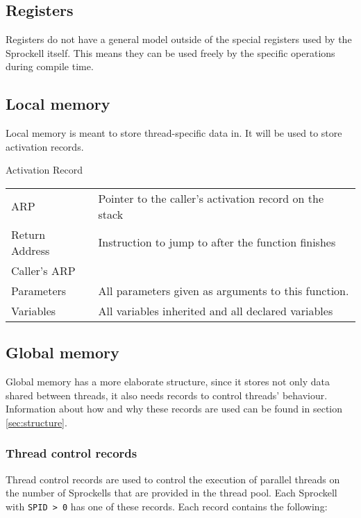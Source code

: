 \documentclass[10pt,a4paper]{report}
\begin{document}
\subsection{Registers}
Registers do not have a general model outside of the special registers used by the Sprockell itself. This means they can be used freely by the specific operations during compile time.

\subsection{Local memory}
Local memory is meant to store thread-specific data in. It will be used to store activation records. 

\label{fig:actrecord}
Activation Record
 
\begin{tabular}{| l | l |}
\hline
	ARP
		& Pointer to the caller's activation record on the stack \\	

	Return Address
		& Instruction to jump to after the function finishes \\
	
	Caller's ARP 	
		& \\
	
	Parameters 
		& All parameters given as arguments to this function. \\
	
	Variables 
		& All variables inherited and all declared variables \\	
\hline
\end{tabular}

\subsection{Global memory}
Global memory has a more elaborate structure, since it stores not only data shared between threads, it also needs records to control threads' behaviour. Information about how and why these records are used can be found in section \ref{sec:structure}. 

\subsubsection{Thread control records}
Thread control records are used to control the execution of parallel threads on the number of Sprockells that are provided in the thread pool. Each Sprockell with \texttt{SPID > 0} has one of these records. Each record contains the following:
\end{document}
